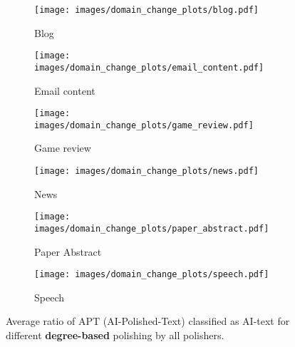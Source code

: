 \begin{figure*}[htbp]
    \centering
    \begin{minipage}{\textwidth} %
        \centering
        \begin{subfigure}{0.48\textwidth}
            \centering
            \texttt{[image: images/domain\_change\_plots/blog.pdf]}
            \caption{Blog}
        \end{subfigure}
        \hfill
        \begin{subfigure}{0.48\textwidth}
            \centering
            \texttt{[image: images/domain\_change\_plots/email\_content.pdf]}
            \caption{Email content}
        \end{subfigure}
    \end{minipage}
    
    \vspace{0.5cm} %
    \begin{minipage}{\textwidth}
    \centering
        \begin{subfigure}{0.48\textwidth}
            \centering
            \texttt{[image: images/domain\_change\_plots/game\_review.pdf]}
            \caption{Game review}
        \end{subfigure}
        \hfill
        \begin{subfigure}{0.48\textwidth}
            \centering
            \texttt{[image: images/domain\_change\_plots/news.pdf]}
            \caption{News}
        \end{subfigure}
    \end{minipage}

    \vspace{0.5cm} %
    \begin{minipage}{\textwidth}
    \centering
        \begin{subfigure}{0.48\textwidth}
            \centering
            \texttt{[image: images/domain\_change\_plots/paper\_abstract.pdf]}
            \caption{Paper Abstract}
            \label{fig:paper_abstract_change}
        \end{subfigure}
        \hfill
        \begin{subfigure}{0.48\textwidth}
            \centering
            \texttt{[image: images/domain\_change\_plots/speech.pdf]}
            \caption{Speech}
        \end{subfigure}
    \end{minipage}
    
    \caption{Average ratio of APT (AI-Polished-Text) classified as AI-text for different \textbf{degree-based} polishing by all polishers.}
    \label{fig:domain_change_plot}
\end{figure*}